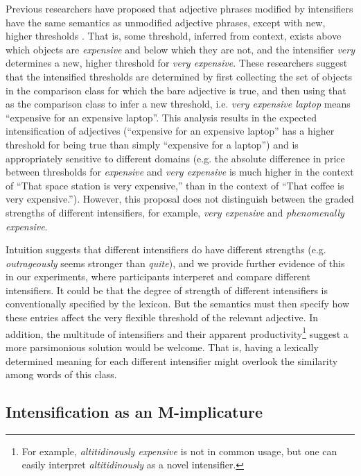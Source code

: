 \documentclass[10pt,letterpaper]{article}
\newcommand{\w}[1]{\emph{#1}}
\begin{document}
Previous researchers have proposed that adjective phrases modified by intensifiers have the same semantics as unmodified adjective phrases, except with new, higher thresholds \cite{kennedyMcnally, klein, wheeler}. That is, some threshold, inferred from context, exists above which objects are \w{expensive} and below which they are not, and the intensifier \w{very} determines a new, higher threshold for \w{very expensive}.
These researchers suggest that the intensified thresholds are determined by first collecting the set of objects in the comparison class for which the bare adjective is true, and then using that as the comparison class to infer a new threshold, i.e. \w{very expensive laptop} means ``expensive for an expensive laptop''. This analysis results in the expected intensification of adjectives (``expensive for an expensive laptop'' has a higher threshold for being true than simply ``expensive for a laptop'') and is appropriately sensitive to different domains (e.g. the absolute difference in price between thresholds for \w{expensive} and \w{very expensive} is much higher in the context of ``That space station is very expensive,'' than in the context of ``That coffee is very expensive.'').
However, this proposal does not distinguish between the graded strengths of different intensifiers, for example, \w{very expensive} and \w{phenomenally expensive}.

Intuition suggests that different intensifiers do have different strengths (e.g. \w{outrageously} seems stronger than \w{quite}), and we provide further evidence of this in our experiments, where participants interperet and compare different intensifiers.
It could be that the degree of strength of different intensifiers is conventionally specified by the lexicon. But the semantics must then specify how these entries affect the very flexible threshold of the relevant adjective.
In addition, the multitude of intensifiers \cite{bolinger} and their apparent productivity\footnote{For example, \w{altitidinously expensive} is not in common usage, but one can easily interpret \w{altitidinously} as a novel intensifier.}
suggest a more parsimonious solution would be welcome. 
That is, having a lexically determined meaning for each different intensifier might overlook the similarity among words of this class.

\subsection{Intensification as an M-implicature}
\end{document}

